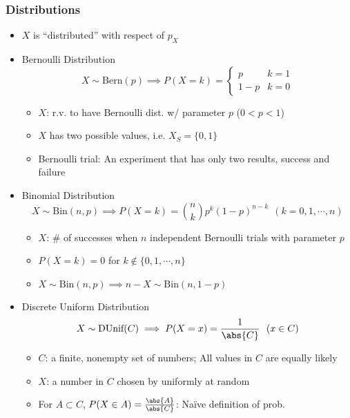 \subsubsection*{Distributions}
\begin{itemize}
    \item $X$ is ``distributed'' with respect of $p_X$
    \item Bernoulli Distribution
    \begin{equation}
        X\sim\text{Bern}(p)\implies P(X=k)=\begin{cases}
            p & k=1\\
            1-p & k=0
        \end{cases}
    \end{equation}
    \begin{itemize}
        \item $X$: r.v. to have Bernoulli dist. w/ parameter $p$ ($0<p<1$)
        \item $X$ has two possible values, i.e. $X_S=\{0,1\}$
        \item Bernoulli trial: An experiment that has only two results, success and failure
    \end{itemize}
    \item Binomial Distribution
    \begin{equation}
        X\sim\text{Bin}(n,p)\implies P(X=k)=\binom{n}{k}p^k(1-p)^{n-k}~~(k=0,1,\cdots,n)
    \end{equation}
    \begin{itemize}
        \item $X$: \# of successes when $n$ independent Bernoulli trials with parameter $p$
        \item $P(X=k)=0$ for $k\notin\{0,1,\cdots,n\}$
        \item $X\sim\text{Bin}(n,p)\implies n-X\sim\text{Bin}(n,1-p)$
    \end{itemize}
    \item Discrete Uniform Distribution
    \begin{equation}
        X\sim\text{DUnif}(C)\implies P(X=x)=\frac{1}{\abs{C}}~~(x\in C)
    \end{equation}
    \begin{itemize}
        \item $C$: a finite, nonempty set of numbers; All values in $C$ are equally likely
        \item $X$: a number in $C$ chosen by uniformly at random
        \item For $A\subset C$, $P(X\in A)=\frac{\abs{A}}{\abs{C}}$: Na\"ive definition of prob.
    \end{itemize}
\end{itemize}

